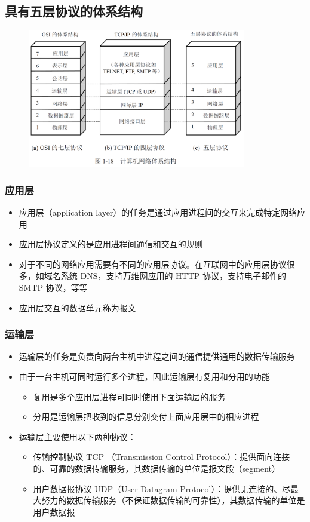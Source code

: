 \documentclass[cs4size,a4paper,10pt]{ctexart}
\begin{document}
	\subsection{具有五层协议的体系结构}
	\begin{figure}[H]
		\centering
		\includegraphics[width=0.85\textwidth]{img/1.18}
	\end{figure}

	\subsubsection{应用层}
	\begin{itemize}
		\item 应用层（application layer）的任务是通过应用进程间的交互来完成特定网络应用
		\item 应用层协议定义的是应用进程间通信和交互的规则
		\item 对于不同的网络应用需要有不同的应用层协议。在互联网中的应用层协议很多，如域名系统 DNS，支持万维网应用的 HTTP 协议，支持电子邮件的 SMTP 协议，等等
		\item 应用层交互的数据单元称为报文
	\end{itemize}

	\subsubsection{运输层}
	\begin{itemize}
		\item 运输层的任务是负责向两台主机中进程之间的通信提供通用的数据传输服务
		\item 由于一台主机可同时运行多个进程，因此运输层有复用和分用的功能
		\begin{itemize}
			\item 复用是多个应用层进程可同时使用下面运输层的服务
			\item 分用是运输层把收到的信息分别交付上面应用层中的相应进程
		\end{itemize}
		\item 运输层主要使用以下两种协议：
		\begin{itemize}
			\item 传输控制协议 TCP （Transmission Control Protocol）：提供面向连接的、可靠的数据传输服务，其数据传输的单位是报文段（segment）
			\item 用户数据报协议 UDP（User Datagram Protocol）：提供无连接的、尽最大努力的数据传输服务（不保证数据传输的可靠性），其数据传输的单位是用户数据报
		\end{itemize}
	\end{itemize}
\end{document}
